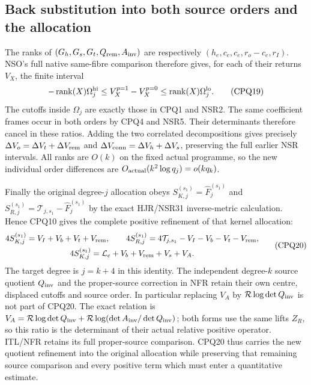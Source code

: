 \documentclass[11pt,a4paper]{article}
\begin{document}
\subsection{Back substitution into both source orders and the allocation}
The ranks of $(G_h,G_s,G_t,Q_{\rm rem},A_{\rm inv})$ are
respectively $(h_e,c_e,c_e,r_o-c_e,r_I)$. NSO's full native
same-fibre comparison therefore gives, for each of their returns
$V_X$, the finite interval
\[
 -\operatorname{rank}(X)\Omega_j^{\rm hi}\le
    V_X^{p=1}-V_X^{p=0}\le
       \operatorname{rank}(X)\Omega_j^{\rm lo}.
 \tag{CPQ19}
\]
The cutoffs inside $\Omega_j$ are exactly those in CPQ1 and
NSR2. The same coefficient frames occur in both orders by CPQ4
and NSR5. Their determinants therefore cancel in these ratios.
Adding the two correlated decompositions gives precisely
$\Delta V_o=\Delta V_t+\Delta V_{\rm rem}$ and
$\Delta V_{\rm conn}=\Delta V_h+\Delta V_s$, preserving the
full earlier NSR intervals. All ranks are $O(k)$ on the fixed
actual programme, so the new individual order differences are
$O_{\rm actual}(k^2\log q_j)=o(kq_k)$.

Finally the original degree-$j$ allocation obeys
$S_{K,j}^{(s_1)}=\widehat F_j^{(s_1)}$ and
$S_{R,j}^{(s_1)}=\mathcal T_{j,s_1}-\widehat F_j^{(s_1)}$
by the exact HJR/NSR31 inverse-metric calculation. Hence CPQ10
gives the complete positive refinement of that kernel allocation:
\[
 \begin{gathered}
 4S_{K,j}^{(s_1)}=V_I+V_b+V_t+V_{\rm rem},\qquad
 4S_{R,j}^{(s_1)}=4\mathcal T_{j,s_1}-V_I-V_b-V_t-V_{\rm rem},\\
 4S_{K,j}^{(s_1)}
      =\mathcal L_e+V_b+V_{\rm rem}+V_s+V_A.
 \end{gathered}\tag{CPQ20}
\]
The target degree is $j=k+4$ in this identity. The independent
degree-$k$ source quotient $Q_{\rm inv}$ and the proper-source
correction in NFR retain their own centre, displaced cutoffs
and source order. In particular replacing $V_A$ by
$\mathcal R\log\det Q_{\rm inv}$ is not part of CPQ20.
The exact relation is
$V_A=\mathcal R\log\det Q_{\rm inv}
+\mathcal R\log(\det A_{\rm inv}/\det Q_{\rm inv})$;
both forms use the same lifts $Z_R$, so this ratio is the
determinant of their actual relative positive operator. ITL/NFR
retains its full proper-source comparison. CPQ20 thus carries
the new quotient refinement into the original allocation while
preserving that remaining source comparison and every positive
term which must enter a quantitative estimate.


\end{document}
